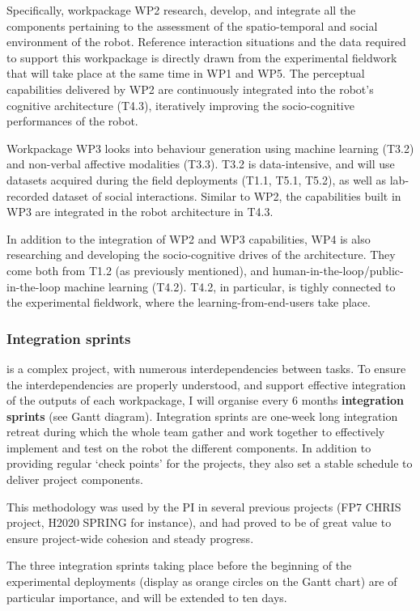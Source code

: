 Specifically, workpackage WP2 research, develop, and integrate all the components
pertaining to the assessment of the spatio-temporal and social environment of
the robot. Reference interaction situations and the data required to support
this workpackage is directly drawn from the experimental fieldwork that will
take place at the same time in WP1 and WP5. The perceptual capabilities
delivered by WP2 are continuously integrated into the robot's cognitive
architecture (T4.3), iteratively improving the socio-cognitive performances of
the robot.

Workpackage WP3 looks into behaviour generation using machine learning (T3.2)
and non-verbal affective modalities (T3.3). T3.2 is data-intensive, and will use
datasets acquired during the field deployments (T1.1, T5.1, T5.2), as well as
lab-recorded dataset of social interactions. Similar to WP2, the capabilities
built in WP3 are integrated in the robot architecture in T4.3.

In addition to the integration of WP2 and WP3 capabilities, WP4 is also
researching and developing the socio-cognitive drives of the architecture. They
come both from T1.2 (as previously mentioned), and
human-in-the-loop/public-in-the-loop machine learning (T4.2). T4.2, in
particular, is tighly connected to the experimental fieldwork, where the
learning-from-end-users take place.

\subsubsection{Integration sprints}

\project is a complex project, with numerous interdependencies between tasks.
To ensure the interdependencies are properly understood, and support effective
integration of the outputs of each workpackage, I will organise every 6 months
\textbf{integration sprints} (see Gantt diagram). Integration sprints are
one-week long integration retreat during which the whole \project team gather
and work together to effectively implement and test on the robot the different
components. In addition to providing regular `check points' for the projects,
they also set a stable schedule to deliver project components.

This methodology was used by the PI in  several previous projects (FP7 CHRIS
project, H2020 SPRING for instance), and had proved to be of great value to
ensure project-wide cohesion and steady progress.

The three integration sprints taking place before the beginning of the
experimental deployments (display as orange circles on the Gantt chart) are of
particular importance, and will be extended to ten days.


